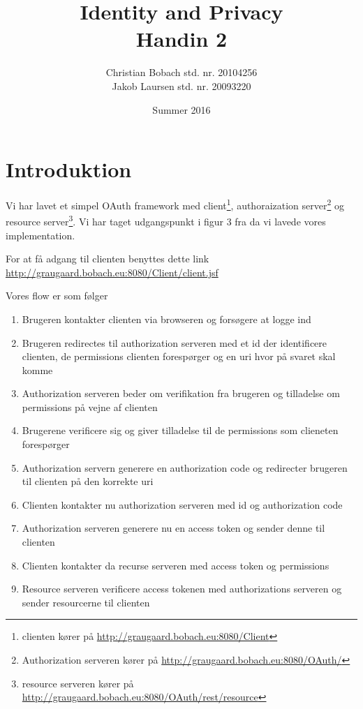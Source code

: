\documentclass[a4paper,12pt]{article}
\title{Identity and Privacy \\Handin 2}
\author{Christian Bobach std. nr. 20104256\\Jakob Laursen std. nr. 20093220}
\date{Summer 2016}
\theoremstyle{plain}
\theoremstyle{nonumberplain}
\begin{document}
\maketitle
\section*{Introduktion}

Vi har lavet et simpel OAuth framework med client\footnote{clienten kører på \url{http://graugaard.bobach.eu:8080/Client}}, authoraization server\footnote{Authorization serveren kører på \url{http://graugaard.bobach.eu:8080/OAuth/}} og resource server\footnote{resource serveren kører på \url{http://graugaard.bobach.eu:8080/OAuth/rest/resource}}. Vi har taget udgangspunkt i figur 3 fra \cite{iogp}  da vi lavede vores implementation.

For at få adgang til clienten benyttes dette link \url{http://graugaard.bobach.eu:8080/Client/client.jsf}

Vores flow er som følger
\begin{enumerate}
    \item Brugeren kontakter clienten via browseren og forsøgere at logge ind
    \item Brugeren redirectes til authorization serveren med et id der identificere clienten, de permissions clienten forespørger og en uri hvor på svaret skal komme
    \item Authorization serveren beder om verifikation fra brugeren og tilladelse om permissions på vejne af clienten
    \item Brugerene verificere sig og giver tilladelse til de permissions som clieneten forespørger
    \item Authorization servern generere en authorization code og redirecter brugeren til clienten på den korrekte uri
    \item Clienten kontakter nu authorization serveren med id og authorization code
    \item Authorization serveren generere nu en access token og sender denne til clienten
    \item Clienten kontakter da recurse serveren med access token og permissions
    \item Resource serveren verificere access tokenen med authorizations serveren og sender resourcerne til clienten
\end{enumerate}
\end{document}
